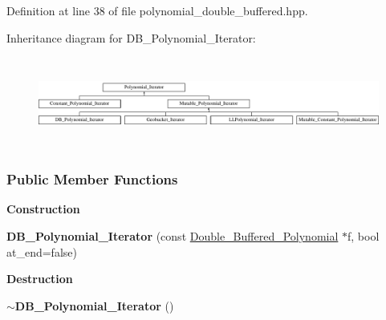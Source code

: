 Definition at line 38 of file polynomial\+\_\+double\+\_\+buffered.\+hpp.

Inheritance diagram for D\+B\+\_\+\+Polynomial\+\_\+\+Iterator\+:\begin{figure}[H]
\begin{center}
\leavevmode
\includegraphics[height=3.000000cm]{group___iterator_group}
\end{center}
\end{figure}
\subsubsection*{Public Member Functions}
\begin{Indent}\textbf{ Construction}\par
\begin{DoxyCompactItemize}
\item 
\mbox{\label{group___iterator_group_aa35fe56e92b8c5a866a4f503f3c9a587}} 
{\bfseries D\+B\+\_\+\+Polynomial\+\_\+\+Iterator} (const \hyperlink{group__polygroup_class_double___buffered___polynomial}{Double\+\_\+\+Buffered\+\_\+\+Polynomial} $\ast$f, bool at\+\_\+end=false)
\end{DoxyCompactItemize}
\end{Indent}
\begin{Indent}\textbf{ Destruction}\par
\begin{DoxyCompactItemize}
\item 
\mbox{\label{group___iterator_group_af8892a1128109ce22d4b6c57ce5e5398}} 
{\bfseries $\sim$\+D\+B\+\_\+\+Polynomial\+\_\+\+Iterator} ()
\end{DoxyCompactItemize}
\end{Indent}
